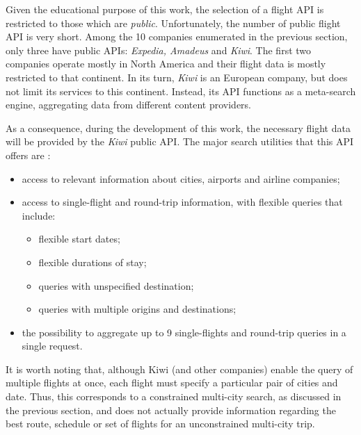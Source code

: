Given the educational purpose of this work, the selection of a flight API is restricted to those which are \textit{public}. Unfortunately, the number of public flight API is very short. Among the 10 companies enumerated in the previous section, only three have public APIs: \textit{Expedia, Amadeus} and \textit{Kiwi}. The first two companies operate mostly in North America and their flight data is mostly restricted to that continent. In its turn, \textit{Kiwi} is an European company, but does not limit its services to this continent. Instead, its API functions as a meta-search engine, aggregating data from different content providers. 

As a consequence, during the development of this work, the necessary flight data will be provided by the \textit{Kiwi} public API. The major search utilities that this API offers are \cite{kiwi_api}:

\begin{itemize}
    \item access to relevant information about cities, airports and airline companies;
    \item access to single-flight and round-trip information, with flexible queries that include:
        \begin{itemize}
            \item flexible start dates;
            \item flexible durations of stay;
            \item queries with unspecified destination;
            \item queries with multiple origins and destinations;
        \end{itemize}
  \item the possibility to aggregate up to 9 single-flights and round-trip queries in a single request.
\end{itemize}

It is worth noting that, although Kiwi (and other companies) enable the query of multiple flights at once, each flight must specify a particular pair of cities and date. Thus, this corresponds to a constrained multi-city search, as discussed in the previous section, and does not actually provide information regarding the best route, schedule or set of flights for an unconstrained multi-city trip.  
